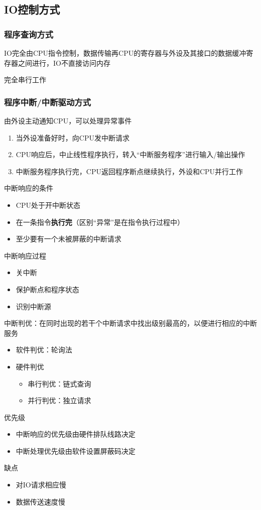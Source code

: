 
\subsection{IO控制方式}
\subsubsection{程序查询方式}
IO完全由CPU指令控制，数据传输再CPU的寄存器与外设及其接口的数据缓冲寄存器之间进行，IO不直接访问内存
\par 完全串行工作

\subsubsection{程序中断/中断驱动方式}
由外设主动通知CPU，可以处理异常事件
\begin{enumerate}
	\item 当外设准备好时，向CPU发中断请求
	\item CPU响应后，中止线性程序执行，转入“中断服务程序”进行输入/输出操作
	\item 中断服务程序执行完，CPU返回程序断点继续执行，外设和CPU并行工作
\end{enumerate}
中断响应的条件
\begin{itemize}
	\item CPU处于开中断状态
	\item 在一条指令\textbf{执行完}（区别“异常”是在指令执行过程中）
	\item 至少要有一个未被屏蔽的中断请求
\end{itemize}
中断响应过程
\begin{itemize}
	\item 关中断
	\item 保护断点和程序状态
	\item 识别中断源
\end{itemize}
中断判优：在同时出现的若干个中断请求中找出级别最高的，以便进行相应的中断服务
\begin{itemize}
	\item 软件判优：轮询法
	\item 硬件判优
	\begin{itemize}
		\item 串行判优：链式查询
		\item 并行判优：独立请求
	\end{itemize}
\end{itemize}
优先级
\begin{itemize}
	\item 中断响应的优先级由硬件排队线路决定
	\item 中断处理优先级由软件设置屏蔽码决定
\end{itemize}
缺点
\begin{itemize}
	\item 对IO请求相应慢
	\item 数据传送速度慢
\end{itemize}


